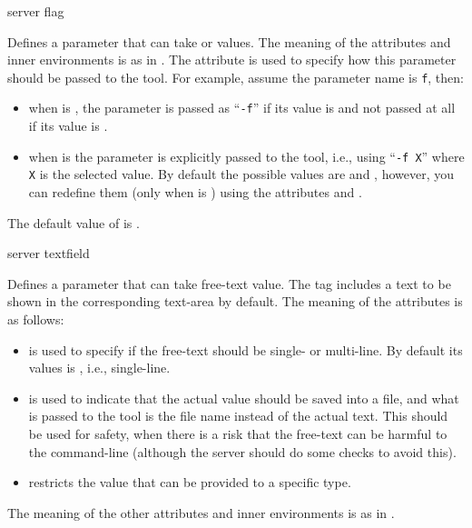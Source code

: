 \bigskip
\xmlstruct
{server}
{flag}
{%
%
  Defines a parameter that can take  or 
  values. The meaning of the attributes and inner environments is as
  in .  The attribute
   is used to specify how this parameter
  should be passed to the tool. For example, assume the parameter name
  is \texttt{f}, then:
  \begin{itemize}
  \item when  is , the
    parameter is passed as ``\texttt{-f}'' if its value is 
    and not passed at all if its value is .

  \item when  is  the
    parameter is explicitly passed to the tool, i.e., using
    ``\texttt{-f X}'' where \texttt{X} is the selected value. By
    default the possible values are  and ,
    however, you can redefine them (only when 
    is ) using the attributes
     and .
  \end{itemize}
%
  The default value of  is
  .
%
}


\bigskip
\xmlstruct
{server}
{textfield}
{%
%
  Defines a parameter that can take free-text value.  The
   tag includes a text to be shown in the
  corresponding text-area by default.  The meaning of the attributes
  is as follows:
%
\begin{itemize}
%
\item {} is used to specify if the free-text
  should be single- or multi-line. By default its values is
  , i.e., single-line.
%
\item {} is used to indicate that the actual
  value should be saved into a file, and what is passed to the tool is
  the file name instead of the actual text.
  This should be used for safety, when there is a risk that the
  free-text can be harmful to the command-line (although the server
  should do some checks to avoid this).
%
\item {} restricts the value that can be provided to
  a specific type.
\end{itemize}
%
The meaning of the other attributes and inner environments is as in
.
%
}



